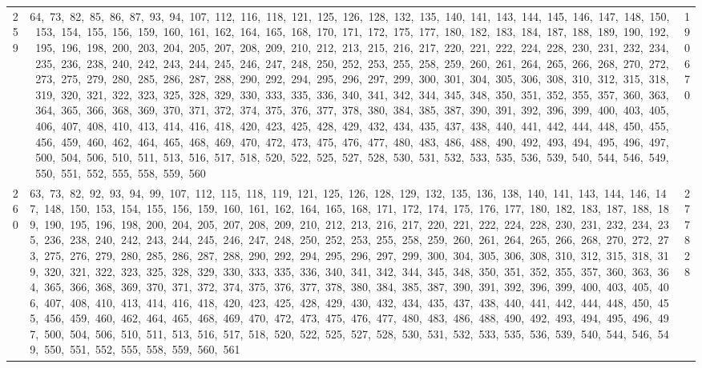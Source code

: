 \begin{longtable}{c|p{}|r}
259 & 64,\ 73,\ 82,\ 85,\ 86,\ 87,\ 93,\ 94,\ 107,\ 112,\ 116,\ 118,\ 121,\ 125,\ 126,\ 128,\ 132,\ 135,\ 140,\ 141,\ 143,\ 144,\ 145,\ 146,\ 147,\ 148,\ 150,\ 153,\ 154,\ 155,\ 156,\ 159,\ 160,\ 161,\ 162,\ 164,\ 165,\ 168,\ 170,\ 171,\ 172,\ 175,\ 177,\ 180,\ 182,\ 183,\ 184,\ 187,\ 188,\ 189,\ 190,\ 192,\ 195,\ 196,\ 198,\ 200,\ 203,\ 204,\ 205,\ 207,\ 208,\ 209,\ 210,\ 212,\ 213,\ 215,\ 216,\ 217,\ 220,\ 221,\ 222,\ 224,\ 228,\ 230,\ 231,\ 232,\ 234,\ 235,\ 236,\ 238,\ 240,\ 242,\ 243,\ 244,\ 245,\ 246,\ 247,\ 248,\ 250,\ 252,\ 253,\ 255,\ 258,\ 259,\ 260,\ 261,\ 264,\ 265,\ 266,\ 268,\ 270,\ 272,\ 273,\ 275,\ 279,\ 280,\ 285,\ 286,\ 287,\ 288,\ 290,\ 292,\ 294,\ 295,\ 296,\ 297,\ 299,\ 300,\ 301,\ 304,\ 305,\ 306,\ 308,\ 310,\ 312,\ 315,\ 318,\ 319,\ 320,\ 321,\ 322,\ 323,\ 325,\ 328,\ 329,\ 330,\ 333,\ 335,\ 336,\ 340,\ 341,\ 342,\ 344,\ 345,\ 348,\ 350,\ 351,\ 352,\ 355,\ 357,\ 360,\ 363,\ 364,\ 365,\ 366,\ 368,\ 369,\ 370,\ 371,\ 372,\ 374,\ 375,\ 376,\ 377,\ 378,\ 380,\ 384,\ 385,\ 387,\ 390,\ 391,\ 392,\ 396,\ 399,\ 400,\ 403,\ 405,\ 406,\ 407,\ 408,\ 410,\ 413,\ 414,\ 416,\ 418,\ 420,\ 423,\ 425,\ 428,\ 429,\ 432,\ 434,\ 435,\ 437,\ 438,\ 440,\ 441,\ 442,\ 444,\ 448,\ 450,\ 455,\ 456,\ 459,\ 460,\ 462,\ 464,\ 465,\ 468,\ 469,\ 470,\ 472,\ 473,\ 475,\ 476,\ 477,\ 480,\ 483,\ 486,\ 488,\ 490,\ 492,\ 493,\ 494,\ 495,\ 496,\ 497,\ 500,\ 504,\ 506,\ 510,\ 511,\ 513,\ 516,\ 517,\ 518,\ 520,\ 522,\ 525,\ 527,\ 528,\ 530,\ 531,\ 532,\ 533,\ 535,\ 536,\ 539,\ 540,\ 544,\ 546,\ 549,\ 550,\ 551,\ 552,\ 555,\ 558,\ 559,\ 560 & 190670 \\
260 & 63,\ 73,\ 82,\ 92,\ 93,\ 94,\ 99,\ 107,\ 112,\ 115,\ 118,\ 119,\ 121,\ 125,\ 126,\ 128,\ 129,\ 132,\ 135,\ 136,\ 138,\ 140,\ 141,\ 143,\ 144,\ 146,\ 147,\ 148,\ 150,\ 153,\ 154,\ 155,\ 156,\ 159,\ 160,\ 161,\ 162,\ 164,\ 165,\ 168,\ 171,\ 172,\ 174,\ 175,\ 176,\ 177,\ 180,\ 182,\ 183,\ 187,\ 188,\ 189,\ 190,\ 195,\ 196,\ 198,\ 200,\ 204,\ 205,\ 207,\ 208,\ 209,\ 210,\ 212,\ 213,\ 216,\ 217,\ 220,\ 221,\ 222,\ 224,\ 228,\ 230,\ 231,\ 232,\ 234,\ 235,\ 236,\ 238,\ 240,\ 242,\ 243,\ 244,\ 245,\ 246,\ 247,\ 248,\ 250,\ 252,\ 253,\ 255,\ 258,\ 259,\ 260,\ 261,\ 264,\ 265,\ 266,\ 268,\ 270,\ 272,\ 273,\ 275,\ 276,\ 279,\ 280,\ 285,\ 286,\ 287,\ 288,\ 290,\ 292,\ 294,\ 295,\ 296,\ 297,\ 299,\ 300,\ 304,\ 305,\ 306,\ 308,\ 310,\ 312,\ 315,\ 318,\ 319,\ 320,\ 321,\ 322,\ 323,\ 325,\ 328,\ 329,\ 330,\ 333,\ 335,\ 336,\ 340,\ 341,\ 342,\ 344,\ 345,\ 348,\ 350,\ 351,\ 352,\ 355,\ 357,\ 360,\ 363,\ 364,\ 365,\ 366,\ 368,\ 369,\ 370,\ 371,\ 372,\ 374,\ 375,\ 376,\ 377,\ 378,\ 380,\ 384,\ 385,\ 387,\ 390,\ 391,\ 392,\ 396,\ 399,\ 400,\ 403,\ 405,\ 406,\ 407,\ 408,\ 410,\ 413,\ 414,\ 416,\ 418,\ 420,\ 423,\ 425,\ 428,\ 429,\ 430,\ 432,\ 434,\ 435,\ 437,\ 438,\ 440,\ 441,\ 442,\ 444,\ 448,\ 450,\ 455,\ 456,\ 459,\ 460,\ 462,\ 464,\ 465,\ 468,\ 469,\ 470,\ 472,\ 473,\ 475,\ 476,\ 477,\ 480,\ 483,\ 486,\ 488,\ 490,\ 492,\ 493,\ 494,\ 495,\ 496,\ 497,\ 500,\ 504,\ 506,\ 510,\ 511,\ 513,\ 516,\ 517,\ 518,\ 520,\ 522,\ 525,\ 527,\ 528,\ 530,\ 531,\ 532,\ 533,\ 535,\ 536,\ 539,\ 540,\ 544,\ 546,\ 549,\ 550,\ 551,\ 552,\ 555,\ 558,\ 559,\ 560,\ 561 & 277828 \\

\end{longtable}
